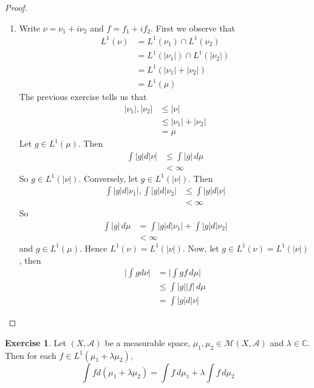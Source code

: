 \documentclass[12pt]{amsart}
\theoremstyle{definition}
\newtheorem{ex}[definition]{Exercise}
\newcommand{\lam}{\lambda}
\newcommand{\C}{\mathbb{C}}
\newcommand{\MA}{\mathcal{A}}
\newcommand{\MM}{\mathcal{M}}
\newcommand{\dmu}{\, d \mu}
\newcommand{\lex}[1]{\label{ex:#1}}
\begin{document}
\begin{proof}
\begin{enumerate}
			A previous exercise tells us that $|f| \neq 0$ $|\nu|$-a.e. Thus $|g|=1$ $|\nu|$-a.e.\\
			\item Write $\nu = \nu_1 + i\nu_2$ and $f = f_1 + if_2$. First we observe that
			\begin{align*}
				L^1(\nu)
				&= L^1(\nu_1) \cap L^1(\nu_2) \\
				&= L^1(|\nu_1|) \cap L^1(|\nu_2|)\\
				&= L^1(|\nu_1| + |\nu_2|)\\
				&= L^1(\mu)
			\end{align*}
			The previous exercise tells us that 
			\begin{align*}
				|\nu_1|, |\nu_2| 
				&\leq |\nu| \\
				&\leq |\nu_1|+ |\nu_2| \\
				&= \mu
			\end{align*}
			Let $g \in L^1(\mu)$. Then 
			\begin{align*}
				\int |g| d |\nu| 
				&\leq \int |g| \dmu \\
				&< \infty
			\end{align*}
			So $g \in L^1(|\nu|)$.
			Conversely, let $g \in L^1(|\nu|)$. Then 
			\begin{align*}
				\int |g| d|\nu_1|, \int |g| d |\nu_2| 
				& \leq \int |g|d |\nu|\\
				& < \infty
			\end{align*}
			So 
			\begin{align*}
				\int |g| \dmu
				& =\int |g| d|\nu_1| + \int |g| d |\nu_2| \\
				& < \infty
			\end{align*}
			and $g \in L^1(\mu)$. Hence $L^1(\nu) = L^1(|\nu|)$. 
			Now, let $g \in L^1(\nu) = L^1(|\nu|)$, then 
			\begin{align*}
				\bigg| \int g d\nu \bigg| 
				&= \bigg| \int g f \dmu \bigg| \\
				& \leq \int |g||f|\dmu\\
				& = \int |g| d |\nu|
			\end{align*}
			
		\end{enumerate}
	\end{proof}


	\begin{ex} \lex{43010} 
	Let $(X, \MA)$ be a measurable space, $\mu_1, \mu_2 \in \MM(X, \MA)$ and $\lam \in \C$. Then for each $f \in L^1(\mu_1 + \lam \mu_2)$, $$\int f d(\mu_1 + \lam \mu_2) = \int f \dmu_1 + \lam \int f \dmu_2$$
	\end{ex}
	
\end{document}

